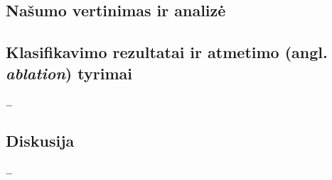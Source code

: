 \subsection*{Našumo vertinimas ir analizė}\label{chap:threelt}

\subsection*{Klasifikavimo rezultatai ir atmetimo (angl. \textit{ablation}) tyrimai}
\dots
\subsection*{Diskusija}\label{susec:discussionlt}
\dots
